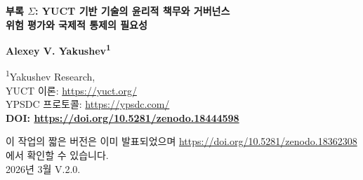 \documentclass[12pt,a4paper]{article}
\theoremstyle{remark}
\begin{document}
	
	\begin{titlepage}
		\begin{center}
			\vspace*{1cm}
			
			{\Huge\textbf{부록 $\Sigma$: YUCT 기반 기술의 윤리적 책무와 거버넌스}} \\
			\vspace{0.5cm}
			{\Large\textbf{위험 평가와 국제적 통제의 필요성}}
			
			\vspace{1.5cm}
			
			{\Large\textbf{Alexey V. Yakushev\textsuperscript{1}}}
			
			\vspace{0.3cm}
			\large
			\textsuperscript{1}Yakushev Research, \\ 
			YUCT 이론: \url{https://yuct.org/}\\
			YPSDC 프로토콜: \url{https://ypsdc.com/}\\
			
			\vspace{2cm}
			\textbf{DOI: \url{https://doi.org/10.5281/zenodo.18444598}}\\
			
			\vspace{1cm}
			
			\large 
			이 작업의 짧은 버전은 이미 발표되었으며 \url{https://doi.org/10.5281/zenodo.18362308} 에서 확인할 수 있습니다.\\
			\vspace{1cm}
			2026년 3월 \quad \large V.2.0.
			
			\vspace{1cm}
			\newpage
			\begin{minipage}{0.9\textwidth}
				\begin{abstract}
					\noindent
					야쿠셰프 통합 조정 이론(Yakushev Unified Coordination Theory, YUCT)은 물리학, 화학, 생물학, 사회과학을 통합하는 수학적 틀을 제공한다. 정밀 화학 및 지구물리 탐사에서 경제 예측 및 인지 향상에 이르는 실용적 응용은 전례 없는 혜택과 해악을 동시에 지닌다. 본 부록은 YUCT에서 파생된 주요 기술 및 이론이 낳은 새로운 생성적 과학 분야와 관련된 위험을 체계적으로 검토한다. 우리는 바로 이 도구들의 강력함이 금지가 아닌 통제, 개발 형평성, 적용 범위의 의식적 확장에 기반한 새로운 수준의 글로벌 거버넌스를 요구한다고 주장한다. 핵 비확산의 성공적 선례에 기대어, 기본 조약, 검증 기구, 수출 통제 체제, 구속력 있는 유엔 안전보장이사회 결의를 포함하는 다층적 국제 아키텍처를 제안한다. 행성 규모에서 우주론적 수준에 이르는 스케일링 효과와 예방적 윤리 성찰의 필요성에 특별한 주의를 기울인다.
				\end{abstract}
			\end{minipage}
			

\end{center}
\end{titlepage}
\end{document}
